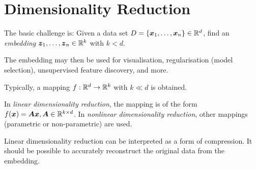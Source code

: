 \section{Dimensionality Reduction}
The basic challenge is:
Given a data set
$D = \{\boldsymbol{x}_1, \dotsc, \boldsymbol{x}_n\} \in \mathbb{R}^d$,
find an \emph{embedding}
$\boldsymbol{z}_1, \dotsc, \boldsymbol{z}_n \in \mathbb{R}^k$
with $k < d$.

The embedding may then be used for visualisation,
regularisation (model selection),
unsupervised feature discovery,
and more.

Typically, a mapping $f : \mathbb{R}^d \to \mathbb{R}^k$
with $k \ll d$ is obtained.

In \emph{linear dimensionality reduction},
the mapping is of the form
$f(\boldsymbol{x}) = \boldsymbol{A}\boldsymbol{x}, \boldsymbol{A} \in \mathbb{R}^{k \times d}$.
In \emph{nonlinear dimensionality reduction},
other mappings (parametric or non-parametric) are used.

Linear dimensionality reduction can be interpreted as a form of
compression.
It should be possible to accurately reconstruct the original data
from the embedding.
